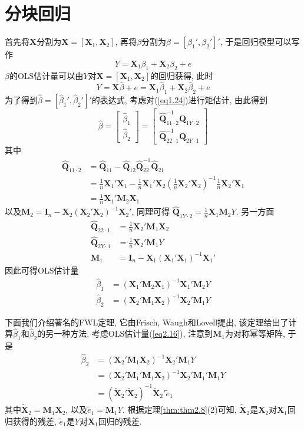 \documentclass[cn, 12pt, math=mtpro2, bibstyle=apa, blue, twocol]{elegantbook}
\newcommand{\Q}{\mathbold{Q}}
\newcommand{\X}{\mathbold{X}}
\newcommand{\hb}{\hat{\beta}}
\newcommand{\M}{\mathbold{M}}
\begin{document}
\section{分块回归}
首先将$\X$分割为$\X=[\X_1,\X_2]$, 再将$\beta$分割为$\beta=[\beta_1',\beta_2']'$, 于是回归模型可以写作
\begin{equation}\label{eq2.17}
  Y=\X_1\beta_1+\X_2\beta_2+e
\end{equation}
$\beta$的OLS估计量可以由$Y$对$\X=[\X_1,\X_2]$的回归获得, 此时
\begin{equation}
  Y=\X\hb+e=\X_1\hb_1+\X_2\hb_2+e
\end{equation}
为了得到$\hb=[\hb_1',\hb_2']'$的表达式, 考虑对(\ref{eq1.24})进行矩估计, 由此得到
$$\hb=\begin{bmatrix}
        \hb_1 \\
        \hb_2
      \end{bmatrix}=\begin{bmatrix}
                      \hat{\Q}_{11\cdot2}^{-1}\hat{\Q}_{1Y\cdot2} \\
                      \hat{\Q}_{22\cdot1}^{-1}\hat{\Q}_{2Y\cdot1}
                    \end{bmatrix}$$
其中
\begin{align*}
\hat{\Q}_{11\cdot2}&=\hat{\Q}_{11}-\hat{\Q}_{12}\hat{\Q}_{22}^{-1}\hat{\Q}_{21} \\
&=\frac{1}{n}\X_1'\X_1-\frac{1}{n}\X_1'\X_2\left(\frac{1}{n}\X_2'\X_2\right)^{-1}\frac{1}{n}\X_2'\X_1 \\
&=\frac{1}{n}\X_1'\mathbold{M}_2\X_1
\end{align*}
以及$\mathbold{M}_2=\mathbold{I}_n-\X_2(\X_2'\X_2)^{-1}\X_2'$, 同理可得
$\displaystyle\hat{\Q}_{1Y\cdot2}=\frac{1}{n}\X_1\mathbold{M}_2Y$. 另一方面
\begin{align*}
\hat{\Q}_{22\cdot1}&=\frac{1}{n}\X_2'\mathbold{M}_1\X_2 \\
\hat{\Q}_{2Y\cdot1}&=\frac{1}{n}\X_2'\mathbold{M}_1Y \\
\mathbold{M}_1&=\mathbold{I}_n-\X_1(\X_1'\X_1)^{-1}\X_1'
\end{align*}
因此可得OLS估计量
\begin{align}
\hb_1&=(\X_1'\M_2\X_1)^{-1}\X_1'\M_2Y \label{eq2.15} \\
\hb_2&=(\X_2'\M_1\X_2)^{-1}\X_2'\M_1Y \label{eq2.16}
\end{align}

下面我们介绍著名的FWL定理, 它由Frisch, Waugh和Lovell提出, 该定理给出了计算$\hb_1$和$\hb_2$的另一种方法. 考虑OLS估计量(\ref{eq2.16}), 注意到$\M_1$为对称幂等矩阵, 于是
\begin{align*}
\hb_2&=(\X_2'\M_1\X_2)^{-1}\X_2'\M_1Y \\
&=(\X_2'\M_1'\M_1\X_2)^{-1}\X_2'\M_1'\M_1Y \\
&=(\tilde{\X}_2'\tilde{\X}_2)^{-1}\tilde{\X}_2'\tilde{e}_1
\end{align*}
其中$\tilde{\X}_2=\M_1\X_2$, 以及$\tilde{e}_1=\M_1Y$. 根据定理\ref{thm:thm2.8}(2)可知, $\tilde{\X}_2$是$\X_2$对$\X_1$回归获得的残差, $\tilde{e}_1$是$Y$对$\X_1$回归的残差.
\end{document}
